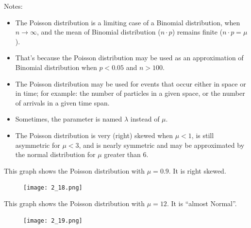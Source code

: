 \begin{frame}
  Notes:
  \begin{itemize}
    \item The Poisson distribution is a limiting case of a Binomial distribution, when $n \rightarrow \infty$, and the mean of Binomial distribution ($n\cdot p$) remains finite ($n\cdot p=\mu$). \\
    \item That's because the Poisson distribution may be used as an approximation of Binomial distribution when $p<0.05$ and $n>100$.\\
    \item The Poisson distribution may be used for events that occur either in space or in time; for example: the number of particles in a given space, or the number of arrivals in a given time span.\\
    \item Sometimes, the parameter is named $\lambda$ instead of $\mu$.\\
    \item The Poisson distribution is very (right) skewed when $\mu<1$, is still asymmetric for $\mu<3$, and is nearly symmetric and may be approximated by the normal distribution for $\mu$ greater than $6$.\\
  \end{itemize}
\end{frame}

\begin{frame}
  \vspace*{.25cm}
  This graph shows the Poisson distribution with $ \mu = 0.9$. It is right skewed.\\
  \vspace*{.5cm}
  \begin{figure}
    \texttt{[image: 2\_18.png]}
  \end{figure}
\end{frame}



\begin{frame}
  \vspace*{.25cm}
  This graph shows the Poisson distribution with $ \mu = 12$. It is ``almost Normal''. \\
  \vspace*{.25cm}
  \begin{figure}
    \texttt{[image: 2\_19.png]} 
  \end{figure}
\end{frame}

